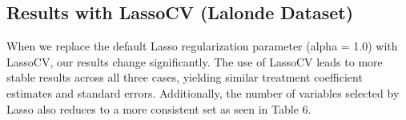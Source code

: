 % 




\subsection{Results with LassoCV (Lalonde Dataset) }
When we replace the default Lasso regularization parameter (alpha = 1.0) with LassoCV, our results change significantly. The use of LassoCV leads to more stable results across all three cases, yielding similar treatment coefficient estimates and standard errors. Additionally, the number of variables selected by Lasso also reduces to a more consistent set as seen in Table 6. 

